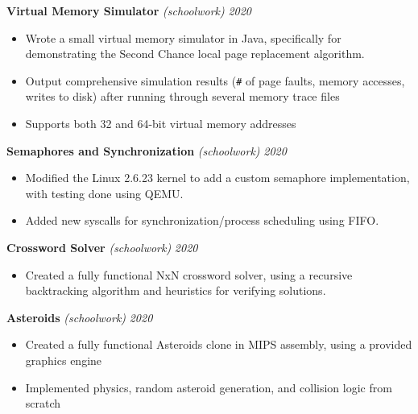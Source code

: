 \documentclass[10pt]{article}
\begin{document}
\begin{flushleft}
		\vspace{2.25mm}
		\textbf{Virtual Memory Simulator} \textit{(schoolwork)} \hfill \textit{\small 2020}
		\vspace{-2mm}
		\begin{itemize}
			\item Wrote a small virtual memory simulator in Java, specifically for demonstrating the Second Chance local page replacement algorithm.
			\vspace{-2mm}
			\item Output comprehensive simulation results (\verb!#! of page faults, memory accesses, writes to disk) after running through several memory trace files
			\vspace{-2mm}
			\item Supports both 32 and 64-bit virtual memory addresses
		\end{itemize}
		\vspace{-1.5mm}
		\pagebreak
		\textbf{Semaphores and Synchronization} \textit{(schoolwork)} \hfill \textit{\small 2020}
		\vspace{-2mm}
		\begin{itemize}
			\item Modified the Linux 2.6.23 kernel to add a custom semaphore implementation, with testing done using QEMU.
			\vspace{-2mm}
			\item Added new syscalls for synchronization/process scheduling using FIFO.
		\end{itemize}
		\vspace{-1.5mm}
		\textbf{Crossword Solver} \textit{(schoolwork)} \hfill \textit{\small 2020}
		\vspace{-2mm}
		\begin{itemize}
			\item Created a fully functional NxN crossword solver, using a recursive backtracking algorithm and heuristics for verifying solutions.	
		\end{itemize}
		\vspace{-1.5mm}
		\textbf{Asteroids} \textit{(schoolwork)} \hfill \textit{\small 2020}
		\vspace{-2mm}
		\begin{itemize}
			\item Created a fully functional Asteroids clone in MIPS assembly, using a provided graphics engine
			\vspace{-2mm}
			\item Implemented physics, random asteroid generation, and collision logic from scratch

\end{itemize}
\end{flushleft}
\end{document}
